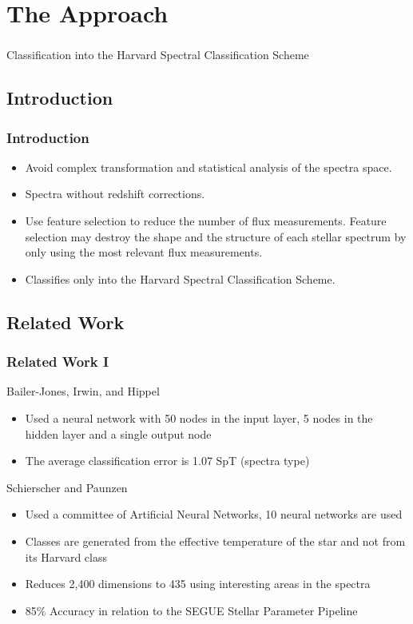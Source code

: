 \documentclass[aspectratio=169]{beamer}
\begin{document}
\section{The Approach}

\begin{frame}
\frametitle{}

\begin{center}
\LARGE
Classification into the Harvard Spectral Classification Scheme
\end{center}

\end{frame}

\subsection{Introduction}
\begin{frame}
\frametitle{Introduction}
\begin{itemize}
	\item Avoid complex transformation and statistical analysis of the spectra space.
	\item Spectra without redshift corrections.
	\item Use feature selection to reduce the number of flux measurements. Feature selection may destroy the shape and the structure of each stellar spectrum by only using the most relevant flux measurements. 
	\item Classifies only into the Harvard Spectral Classification Scheme.
\end{itemize}
\end{frame}

\subsection{Related Work}

\begin{frame}
\frametitle{Related Work I}
Bailer-Jones, Irwin, and Hippel \cite{Bailer} 
\begin{itemize}
\item Used a neural network with 50 nodes in the input layer, 5 nodes in the hidden layer and a single output node
\item The average classification error is 1.07 SpT (spectra type)
\end{itemize}

Schierscher and Paunzen \cite{Schierscher}
\begin{itemize}
\item Used a committee of Artificial Neural Networks, 10 neural networks are used
\item Classes are generated from the effective temperature of the star and not from its Harvard class
\item Reduces 2,400 dimensions to 435 using interesting areas in the spectra
\item 85\% Accuracy in relation to the SEGUE Stellar Parameter Pipeline
\end{itemize}
\end{frame}
\end{document}
